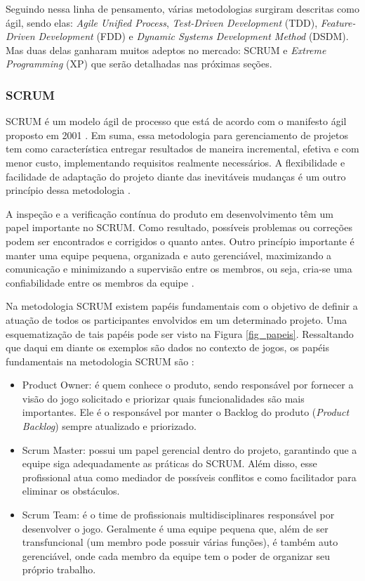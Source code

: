 \documentclass[quali]{ppgccufscar}
\begin{document}
Seguindo nessa linha de pensamento, várias metodologias surgiram descritas como ágil, sendo elas: \textit{Agile Unified Process}, \textit{Test-Driven Development} (TDD), \textit{Feature-Driven Development} (FDD) e \textit{Dynamic Systems Development Method} (DSDM). Mas duas delas ganharam muitos adeptos no mercado: SCRUM e \textit{Extreme Programming} (XP) que serão detalhadas nas próximas seções.


\subsubsection{SCRUM}

SCRUM é um modelo ágil de processo que está de acordo com o manifesto ágil proposto em 2001 \cite{sommerville2010}. Em suma, essa metodologia para gerenciamento de projetos tem como característica entregar resultados de maneira incremental, efetiva e com menor custo, implementando requisitos realmente necessários. A flexibilidade e facilidade de adaptação do projeto diante das inevitáveis mudanças é um outro princípio dessa metodologia \cite{schwaber1997}. 

A inspeção e a verificação contínua do produto em desenvolvimento têm um papel importante no SCRUM. Como resultado, possíveis problemas ou correções podem ser encontrados e corrigidos o quanto antes. Outro princípio importante é manter uma equipe pequena, organizada e auto gerenciável, maximizando a comunicação e minimizando a supervisão entre os membros, ou seja, cria-se uma confiabilidade entre os membros da equipe \cite{pressman2005}.

Na metodologia SCRUM existem papéis fundamentais com o objetivo de definir a atuação de todos os participantes envolvidos em um determinado projeto. Uma esquematização de tais papéis pode ser visto na Figura \ref{fig_papeis}. Ressaltando que daqui em diante os exemplos são dados no contexto de jogos, os papéis fundamentais na metodologia SCRUM são \cite{keith2010}: 

\begin{itemize}
	\item Product Owner: é quem conhece o produto, sendo responsável por fornecer a visão do jogo solicitado e priorizar quais funcionalidades são mais importantes. Ele é o responsável por manter o Backlog do produto (\textit{Product Backlog}) sempre atualizado e priorizado.
	\item Scrum Master: possui um papel gerencial dentro do projeto, garantindo que a equipe siga adequadamente as práticas do SCRUM. Além disso, esse profissional atua como mediador de possíveis conflitos e como facilitador para eliminar os obstáculos.
	\item Scrum Team: é o time de profissionais multidisciplinares responsável por desenvolver o jogo. Geralmente é uma equipe pequena que, além de ser transfuncional (um membro pode possuir várias funções), é também auto gerenciável, onde cada membro da equipe tem o poder de organizar seu próprio trabalho.
\end{itemize}
\end{document}
